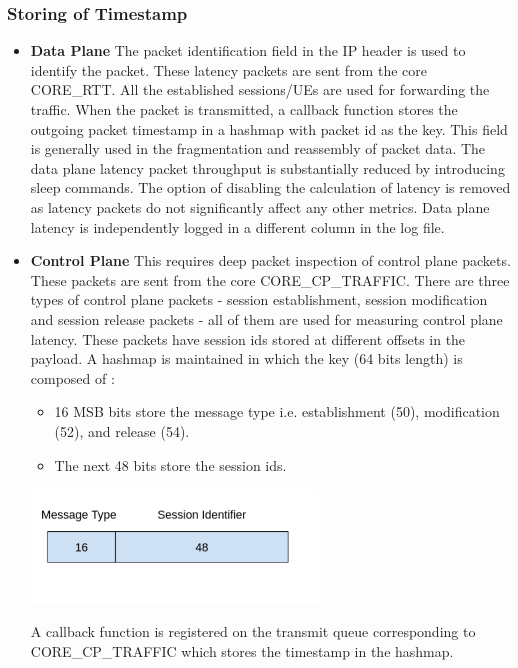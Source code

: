 \documentclass{article}
\begin{document}
\subsubsection{Storing of Timestamp}
\begin{itemize}
    \item \textbf{Data Plane} The packet identification field in the IP header is used to identify the packet. These latency packets
          are sent from the core CORE\_RTT. All the established sessions/UEs are used for forwarding the traffic. When the packet is
          transmitted, a callback  function stores the outgoing packet timestamp in a hashmap with packet id as the key. This field is
          generally used in the fragmentation and reassembly of packet data. The data plane latency packet throughput is substantially reduced by introducing sleep commands. The option of disabling the calculation of latency is removed as latency packets do not significantly affect any other metrics. Data plane latency is independently logged in a different column in the log file.
    \item \textbf{Control Plane}
          This requires deep packet inspection of control plane packets. These packets are sent from the core CORE\_CP\_TRAFFIC.
          There are three types of control plane packets - session establishment, session modification and session release packets - all of
          them are used for measuring control plane latency. These packets have session ids stored at different offsets in the payload. A
          hashmap is maintained in which the key (64 bits length) is composed of :
          \begin{itemize}
              \item 16 MSB bits store the message type i.e. establishment (50), modification (52), and release (54).
              \item The next 48 bits store the session ids.
          \end{itemize}
\includegraphics[width=0.6\textwidth]{KeyField.png}


          A callback function is registered on  the transmit queue corresponding to CORE\_CP\_TRAFFIC which stores the timestamp in the hashmap.
\end{itemize}
\end{document}
